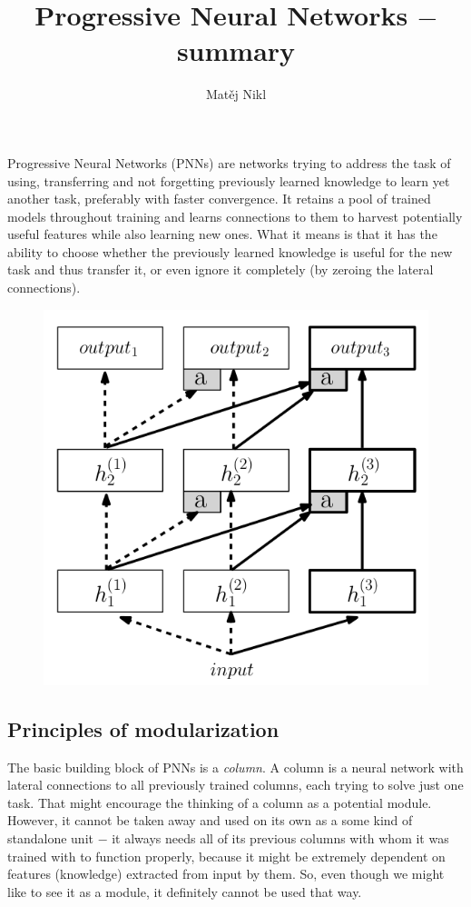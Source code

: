\documentclass[a4paper,twocolumn]{article}
\title{Progressive Neural Networks $-$ summary}
\author{Matěj Nikl}
\begin{document}
\maketitle
Progressive Neural Networks (PNNs) are networks trying to address the task of using, transferring and not forgetting previously learned knowledge to learn yet another task, preferably with faster convergence. It retains a pool of trained models throughout training and learns connections to them to harvest potentially useful features while also learning new ones. What it means is that it has the ability to choose whether the previously learned knowledge is useful for the new task and thus transfer it, or even ignore it completely (by zeroing the lateral connections).

    \begin{figure}[!h]
        \centering
        \includegraphics[width=0.8\columnwidth]{PNN.png}
    \end{figure}

\subsection*{Principles of modularization}
The basic building block of PNNs is a \textit{column}. A column is a neural network with lateral connections to all previously trained columns, each trying to solve just one task. That might encourage the thinking of a column as a potential module. However, it cannot be taken away and used on its own as a some kind of standalone unit $-$ it always needs all of its previous columns with whom it was trained with to function properly, because it might be extremely dependent on features (knowledge) extracted from input by them. So, even though we might like to see it as a module, it definitely cannot be used that way.
\end{document}
